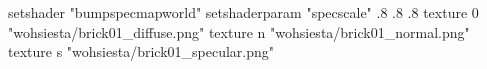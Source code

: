 setshader "bumpspecmapworld"
setshaderparam "specscale" .8 .8 .8
texture 0 "wohsiesta/brick01_diffuse.png"
texture n "wohsiesta/brick01_normal.png"
texture s "wohsiesta/brick01_specular.png"